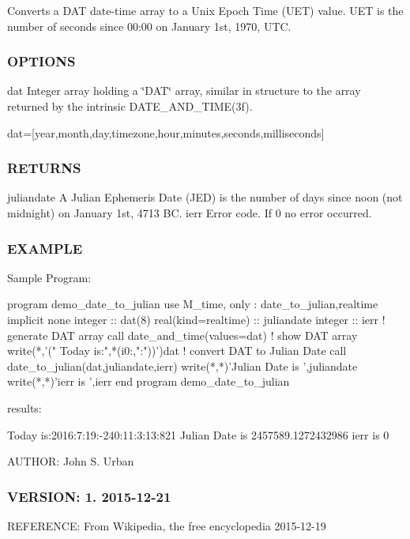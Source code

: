 Converts a D\+AT date-\/time array to a Unix Epoch Time (U\+ET) value. U\+ET is the number of seconds since 00\+:00 on January 1st, 1970, U\+TC.

\subsubsection*{O\+P\+T\+I\+O\+NS}

dat Integer array holding a \char`\"{}\+D\+A\+T\char`\"{} array, similar in structure to the array returned by the intrinsic D\+A\+T\+E\+\_\+\+A\+N\+D\+\_\+\+T\+I\+M\+E(3f).

dat=\mbox{[}year,month,day,timezone,hour,minutes,seconds,milliseconds\mbox{]} \subsubsection*{R\+E\+T\+U\+R\+NS}

juliandate A Julian Ephemeris Date (J\+ED) is the number of days since noon (not midnight) on January 1st, 4713 BC. ierr Error code. If 0 no error occurred.

\subsubsection*{E\+X\+A\+M\+P\+LE}

\begin{DoxyVerb}Sample Program:

 program demo_date_to_julian
 use M_time, only : date_to_julian,realtime
 implicit none
 integer             :: dat(8)
 real(kind=realtime) :: juliandate
 integer             :: ierr
    ! generate DAT array
    call date_and_time(values=dat)
    ! show DAT array
    write(*,'(" Today is:",*(i0:,":"))')dat
    ! convert DAT to Julian Date
    call date_to_julian(dat,juliandate,ierr)
    write(*,*)'Julian Date is ',juliandate
    write(*,*)'ierr is ',ierr
 end program demo_date_to_julian

results:

 Today is:2016:7:19:-240:11:3:13:821
 Julian Date is    2457589.1272432986
 ierr is            0 \end{DoxyVerb}
 A\+U\+T\+H\+OR\+: John S. Urban \subsubsection*{V\+E\+R\+S\+I\+ON\+: 1. 2015-\/12-\/21}

R\+E\+F\+E\+R\+E\+N\+CE\+: From Wikipedia, the free encyclopedia 2015-\/12-\/19 \mbox{\label{namespacem__time_aed245c691853279ebf0ce899dec9caa9}} 
